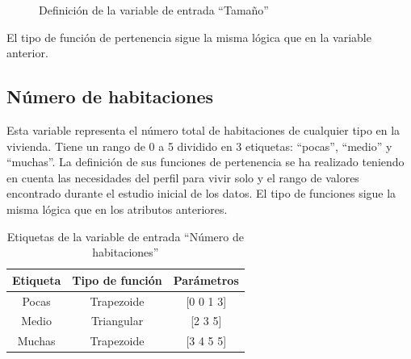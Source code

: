 \documentclass[12pt]{report} %
\begin{document}
        \begin{figure}[H]
            \centering
            \caption{Definición de la variable de entrada ``Tamaño''}
        \end{figure}

        El tipo de función de pertenencia sigue la misma lógica que en la variable anterior. 

        \subsection{Número de habitaciones}
        Esta variable representa el número total de habitaciones de cualquier tipo en la vivienda.
        Tiene un rango de 0 a 5 dividido en 3 etiquetas: ``pocas'', ``medio'' y ``muchas''.
        La definición de sus funciones de pertenencia se ha realizado teniendo en cuenta las necesidades del perfil para vivir solo
         y el rango de valores encontrado durante el estudio inicial de los datos. El tipo de funciones sigue la misma lógica
         que en los atributos anteriores.

        \begin{table}[h]
            \center
            \begin{tabular}{@{}ccc@{}}
                \toprule
                \textbf{Etiqueta} & \textbf{Tipo de función} & \textbf{Parámetros} \\
                \midrule
                Pocas  & Trapezoide & [0 0 1 3] \\
                Medio  & Triangular & [2 3 5]   \\
                Muchas & Trapezoide & [3 4 5 5] \\
                \bottomrule
            \end{tabular}
            \caption{Etiquetas de la variable de entrada ``Número de habitaciones''}
        \end{table}
\end{document}
